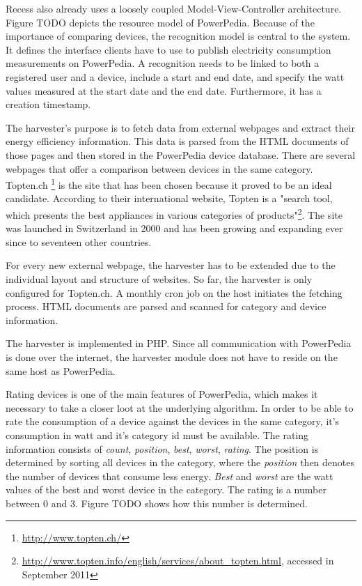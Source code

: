 
Recess also already uses a loosely coupled Model-View-Controller architecture.
Figure TODO depicts the resource model of PowerPedia. Because of the importance of comparing devices, the recognition model is central to the system. It defines the interface clients have to use to publish electricity consumption measurements on PowerPedia. A recognition needs to be linked to both a registered user and a device, include a start and end date, and specify the watt values measured at the start date and the end date. Furthermore, it has a creation timestamp.

The harvester's purpose is to fetch data from external webpages and extract their energy efficiency information. This data is parsed from the HTML documents of those pages and then stored in the PowerPedia device database.
There are several webpages that offer a comparison between devices in the same category. Topten.ch \footnote{\url{http://www.topten.ch/}} is the site that has been chosen because it proved to be an ideal candidate. According to their international website, Topten is a "search tool, which presents the best appliances in various categories of products"\footnote{\url{http://www.topten.info/english/services/about_topten.html}, accessed in September 2011}. The site was launched in Switzerland in 2000 and has been growing and expanding ever since to seventeen other countries. 

For every new external webpage, the harvester has to be extended due to the individual layout and structure of websites. So far, the harvester is only configured for Topten.ch. A monthly cron job on the host initiates the fetching process. HTML documents are parsed and scanned for category and device information. 

The harvester is implemented in PHP. Since all communication with PowerPedia is done over the internet, the harvester module does not have to reside on the same host as PowerPedia. 


Rating devices is one of the main features of PowerPedia, which makes it necessary to take a closer loot at the underlying algorithm.
In order to be able to rate the consumption of a device against the devices in the same category, it's consumption in watt and it's category id must be available. 
The rating information consists of \textit{count}, \textit{position}, \textit{best}, \textit{worst}, \textit{rating}. The position is determined by sorting all devices in the category, where the \textit{position} then denotes the number of devices that consume less energy. \textit{Best} and \textit{worst} are the watt values of the best and worst device in the category. The rating is a number between 0 and 3. Figure TODO shows how this number is determined.
 
